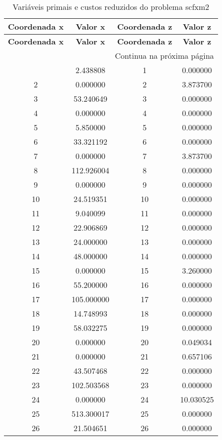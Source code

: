 \documentclass[12pt]{article}
\begin{document}
\begin{longtable}{@{}cccc@{}}
\caption{Variáveis primais e custos reduzidos do problema scfxm2} \\
\toprule
\textbf{Coordenada x} & \textbf{Valor x} & \textbf{Coordenada z} & \textbf{Valor z} \\
\midrule
\endfirsthead

\toprule
\textbf{Coordenada x} & \textbf{Valor x} & \textbf{Coordenada z} & \textbf{Valor z} \\
\midrule
\endhead

\midrule \multicolumn{4}{r}{{Continua na próxima página}} \\ \midrule
\endfoot

\bottomrule
\endlastfoot
1 & 2.438808 & 1 & 0.000000 \\
2 & 0.000000 & 2 & 3.873700 \\
3 & 53.240649 & 3 & 0.000000 \\
4 & 0.000000 & 4 & 0.000000 \\
5 & 5.850000 & 5 & 0.000000 \\
6 & 33.321192 & 6 & 0.000000 \\
7 & 0.000000 & 7 & 3.873700 \\
8 & 112.926004 & 8 & 0.000000 \\
9 & 0.000000 & 9 & 0.000000 \\
10 & 24.519351 & 10 & 0.000000 \\
11 & 9.040099 & 11 & 0.000000 \\
12 & 22.906869 & 12 & 0.000000 \\
13 & 24.000000 & 13 & 0.000000 \\
14 & 48.000000 & 14 & 0.000000 \\
15 & 0.000000 & 15 & 3.260000 \\
16 & 55.200000 & 16 & 0.000000 \\
17 & 105.000000 & 17 & 0.000000 \\
18 & 14.748993 & 18 & 0.000000 \\
19 & 58.032275 & 19 & 0.000000 \\
20 & 0.000000 & 20 & 0.049034 \\
21 & 0.000000 & 21 & 0.657106 \\
22 & 43.507468 & 22 & 0.000000 \\
23 & 102.503568 & 23 & 0.000000 \\
24 & 0.000000 & 24 & 10.030525 \\
25 & 513.300017 & 25 & 0.000000 \\
26 & 21.504651 & 26 & 0.000000 \\

\end{longtable}
\end{document}
